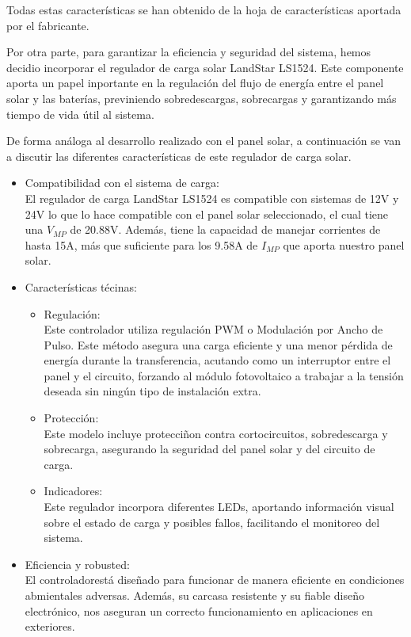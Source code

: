 Todas estas características se han obtenido de la hoja de características aportada por el fabricante.

Por otra parte, para garantizar la eficiencia y seguridad del sistema, hemos decidio incorporar el regulador de carga solar LandStar LS1524. Este componente aporta un papel inportante en la regulación del flujo de energía entre el panel solar y las baterías, previniendo sobredescargas, sobrecargas y garantizando más tiempo de vida útil al sistema.

De forma análoga al desarrollo realizado con el panel solar, a continuación se van a discutir las diferentes características de este regulador de carga solar.

\begin{itemize}
    \item Compatibilidad con el sistema de carga: \\
    El regulador de carga LandStar LS1524 es compatible con sistemas de 12V y 24V lo que lo hace compatible con el panel solar seleccionado, el cual tiene una $V_{MP}$ de 20.88V. Además, tiene la capacidad de manejar corrientes de hasta 15A, más que suficiente para los 9.58A de $I_{MP}$ que aporta nuestro panel solar.

    \item  Características técinas:
    \begin{itemize}
        \item Regulación: \\
        Este controlador utiliza regulación PWM o Modulación por Ancho de Pulso. Este método asegura una carga eficiente y una menor pérdida de energía durante la transferencia, acutando como un interruptor entre el panel y el circuito, forzando al módulo fotovoltaico a trabajar a la tensión deseada sin ningún tipo de instalación extra.
        \item Protección: \\
        Este modelo incluye protecciñon contra cortocircuitos, sobredescarga y sobrecarga, asegurando la seguridad del panel solar y del circuito de carga.
        \item Indicadores: \\
        Este regulador incorpora diferentes LEDs, aportando información visual sobre el estado de carga y posibles fallos, facilitando el monitoreo del sistema.
    \end{itemize}

    \item  Eficiencia y robusted: \\
    El controladorestá diseñado para funcionar de manera eficiente en condiciones abmientales adversas. Además, su carcasa resistente y su fiable diseño electrónico, nos aseguran un correcto funcionamiento en aplicaciones en exteriores.


\end{itemize}
